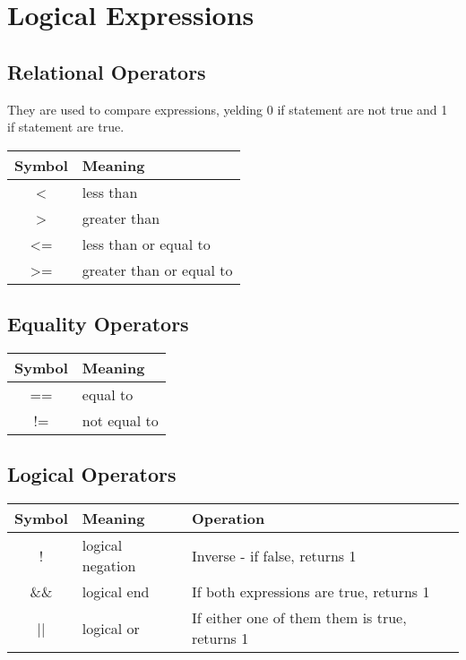 \documentclass[12pt, openany]{book}
\begin{document}
    \section{Logical Expressions}
    \subsection*{Relational Operators}
    They are used to compare expressions, yelding 0 if statement are not true and 1 if
    statement are true.

    \bigskip
    \begin{tabular}{|@{} c l|}  %
        \hline
        \textbf{ Symbol} & \textbf{Meaning} \\
        \hline
        < & less than \\
        > & greater than \\
        <= & less than or equal to \\
        >= & greater than or equal to \\
        \hline
    \end{tabular} 

    \subsection*{Equality Operators}

    \bigskip
    \begin{tabular}{|@{} c l|}
        \hline
        \textbf{ Symbol} & \textbf{Meaning} \\
        \hline
        == & equal to \\
        != & not equal to \\
        \hline
    \end{tabular}

    \subsection*{Logical Operators}

    \bigskip
    \begin{tabular}{|@{} c l l|}
        \hline
        \textbf{ Symbol} & \textbf{Meaning} & \textbf{Operation} \\
        \hline
        ! & logical negation & Inverse - if false, returns 1\\
        \&\& & logical end & If both expressions are true, returns 1 \\
        || & logical or & If either one of them them is true, returns 1 \\ 
        \hline
    \end{tabular}
\end{document}
